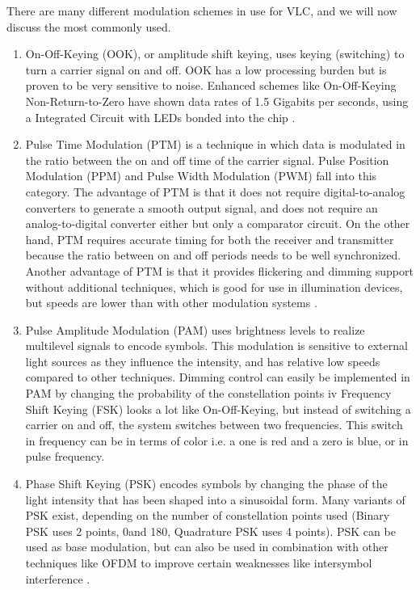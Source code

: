 There are many different modulation schemes in use for VLC, and we will now
discuss the most commonly used.

\begin{enumerate}

\item \label{ook} On-Off-Keying (OOK), or amplitude shift keying, uses keying (switching) to
turn a carrier signal on and off. OOK has a low processing burden but is
proven to be very sensitive to noise. Enhanced schemes like On-Off-Keying
Non-Return-to-Zero have shown data rates of 1.5 Gigabits per seconds,
using a Integrated Circuit with LEDs bonded into the chip \citep{ook-450}.

\item Pulse Time Modulation (PTM) is a technique in which data is modulated
in the ratio between the on and off time of the carrier signal. Pulse Position
Modulation (PPM) and Pulse Width Modulation (PWM) fall into this
category. The advantage of PTM is that it does not require digital-to-analog
converters to generate a smooth output signal, and does not require an
analog-to-digital converter either but only a comparator circuit. On the other
hand, PTM requires accurate timing for both the receiver and transmitter
because the ratio between on and off periods needs to be well synchronized.
Another advantage of PTM is that it provides flickering and dimming
support without additional techniques, which is good for use in illumination
devices, but speeds are lower than with other modulation systems \citep{ppm}.


\item  Pulse Amplitude Modulation (PAM) uses brightness levels to realize multilevel
signals to encode symbols. This modulation is sensitive to external
light sources as they influence the intensity, and has relative low speeds
compared to other techniques. Dimming control can easily be implemented
in PAM by changing the probability of the constellation points \citep{diming}
iv Frequency Shift Keying (FSK) looks a lot like On-Off-Keying, but instead of
switching a carrier on and off, the system switches between two frequencies.
This switch in frequency can be in terms of color i.e. a one is red and
a zero is blue, or in pulse frequency.

\item Phase Shift Keying (PSK) encodes symbols by changing the phase of the
light intensity that has been shaped into a sinusoidal form. Many variants
of PSK exist, depending on the number of constellation points used (Binary
PSK uses 2 points, 0\degree  and 180\degree , Quadrature PSK uses 4 points). PSK
can be used as base modulation, but can also be used in combination
with other techniques like OFDM to improve certain weaknesses like intersymbol
interference \citep{ofdm-plc}.


\end{enumerate}
